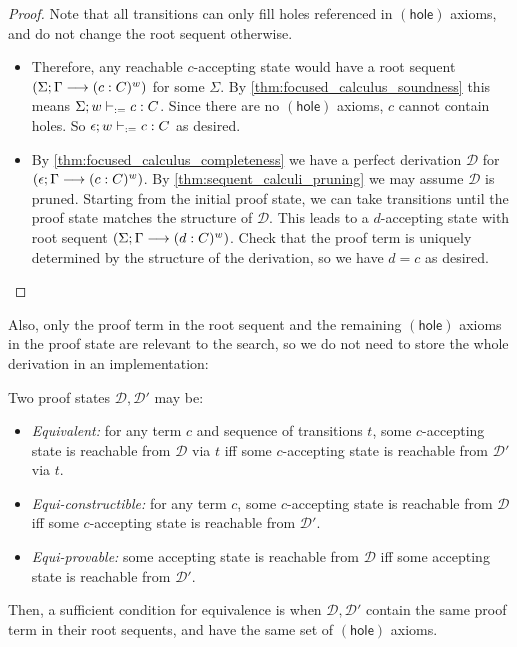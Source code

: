 \documentclass[twoside]{report}
\begin{document}
\begin{proof}
Note that all transitions can only fill holes referenced in $(\mathsf{hole})$ axioms, and do not change the root sequent otherwise.
\begin{itemize}
    \item Therefore, any reachable $c$-accepting state would have a root sequent $(\Sigma; \Gamma \longrightarrow (c : C)^w)$ for some $\Sigma$. By \cref{thm:focused_calculus_soundness} this means $\Sigma; w \vdash_{:=} c : C$. Since there are no $(\mathsf{hole})$ axioms, $c$ cannot contain holes. So $\epsilon; w \vdash_{:=} c : C$ as desired.

    \item By \cref{thm:focused_calculus_completeness} we have a perfect derivation $\mathcal D$ for $(\epsilon; \Gamma \longrightarrow (c : C)^w)$. By \cref{thm:sequent_calculi_pruning} we may assume $\mathcal D$ is pruned. Starting from the initial proof state, we can take transitions until the proof state matches the structure of $\mathcal D$. This leads to a $d$-accepting state with root sequent $(\Sigma; \Gamma \longrightarrow (d : C)^w)$. Check that the proof term is uniquely determined by the structure of the derivation, so we have $d = c$ as desired. \qedhere
\end{itemize}
\end{proof}

Also, only the proof term in the root sequent and the remaining $(\mathsf{hole})$ axioms in the proof state are relevant to the search, so we do not need to store the whole derivation in an implementation:

\begin{proposition}
\label{thm:tableau_states_equivalence}
Two proof states $\mathcal D, \mathcal D'$ may be:
\begin{itemize}
    \item \emph{Equivalent:} for any term $c$ and sequence of transitions $t$, some $c$-accepting state is reachable from $\mathcal D$ via $t$ iff some $c$-accepting state is reachable from $\mathcal D'$ via $t$.

    \item \emph{Equi-constructible:} for any term $c$, some $c$-accepting state is reachable from $\mathcal D$ iff some $c$-accepting state is reachable from $\mathcal D'$.

    \item \emph{Equi-provable:} some accepting state is reachable from $\mathcal D$ iff some accepting state is reachable from $\mathcal D'$.
\end{itemize}
Then, a sufficient condition for equivalence is when $\mathcal D, \mathcal D'$ contain the same proof term in their root sequents, and have the same set of $(\mathsf{hole})$ axioms.
\end{proposition}
\end{document}
